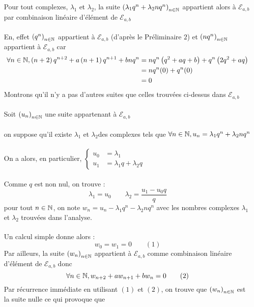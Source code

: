 \begin{dem}
\begin{itemize}
        Pour tout complexes, \(\lambda_1\) et \(\lambda_2\), la suite \(\left(\lambda_1 q^n + \lambda_2 n q^n\right)_{n \in \mathbb{N}}\) appartient alors à \(\mathcal{E}_{a,b}\) par combinaison linéaire d'élément de \(\mathcal{E}_{a,b}\)\\~\\
        En, effet \(\left(q^n\right)_{n\in \mathbb{N}}\) appartient à \(\mathcal{E}_{a,b}\) (d'après le Préliminaire \(2\)) et \(\left(nq^n\right)_{n \in \mathbb{N}}\) appartient à \(\mathcal{E}_{a,b}\) car 
        \begin{align*}
            \forall n \in \mathbb{N}, \left(n+2\right)q^{n+2}+a\left(n+1\right)q^{n+1} + bnq^n &= nq^n\left(q^2+aq+b\right) + q^n\left(2q^2+aq\right) \\
            &= nq^n(0)+q^n(0) \\
            &=0
        \end{align*}
        Montrons qu'il n'y a pas d'autres suites que celles trouvées ci-dessus dans \(\mathcal{E}_{a,b}\) \\~\\
        Soit \(\left(u_n\right)_{n \in \mathbb{N}}\) une suite appartenant à \(\mathcal{E}_{a,b}\)\\~\\
        \analyse on suppose qu'il existe \(\lambda_1\) et \(\lambda_2\)des complexes tels que \(\forall n \in \mathbb{N}, u_n = \lambda_1q^n + \lambda_2nq^n\)\\~\\
        On a alors, en particulier, \(\begin{cases}
            u_0 &= \lambda_1 \\
            u_1 &= \lambda_1q+\lambda_2q
        \end{cases}\)\\~\\
        Comme \(q\) est non nul, on trouve :
        \[\lambda_1 = u_0 \qquad \lambda_2 = \frac{u_1-u_0q}{q}\]
        \synthese pour tout \(n \in \mathbb{N}\), on note \(w_n = u_n-\lambda_1 q^n - \lambda_2 n q^n\) avec les nombres complexes \(\lambda_1\) et \(\lambda_2\) trouvées dans l'analyse. \\~\\
        Un calcul simple donne alors :\[w_0 = w_1 =0 \qquad (1)\]
        Par ailleurs, la suite \(\left(w_n\right)_{n\in \mathbb{N}}\) appartient à \(\mathcal{E}_{a,b}\) comme combinaison linéaire d'élément de \(\mathcal{E}_{a,b}\) donc 
        \[\forall n \in \mathbb{N},w_{n+2}+a w_{n+1}+bw_n = 0 \qquad (2)\]
        Par récurrence immédiate en utilisant \((1)\) et \((2)\), on trouve que \(\left(w_n\right)_{n\in \mathbb{N}}\) est la suite nulle ce qui provoque que 

\end{itemize}
\end{dem}
